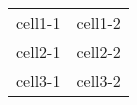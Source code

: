 \label{\detokenize{tabular:simple-table}}

\begin{savenotes}\sphinxattablestart
\centering
\begin{tabulary}{\linewidth}[t]{|T|T|}
\hline 
{}\relax &\relax \\
\hline 
cell1-1
&
cell1-2
\\
\hline 
cell2-1
&
cell2-2
\\
\hline 
cell3-1
&
cell3-2
\\
\hline 
\end{tabulary}
\par
\sphinxattableend\end{savenotes}
